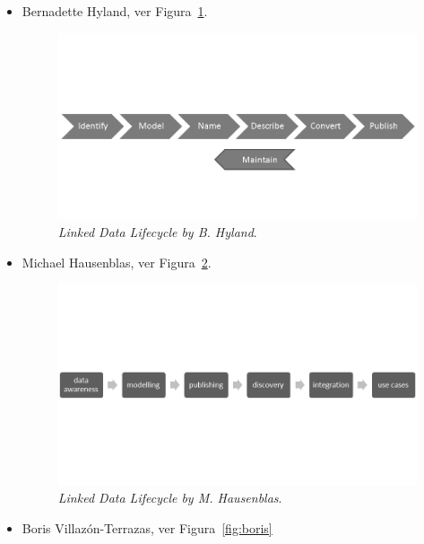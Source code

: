 \begin{itemize}
 \item Bernadette Hyland, ver Figura~\ref{fig:hyland}. 

\begin{figure}[!htb]
\centering
	\includegraphics[width=14cm]{images/phd/Hyland}
\caption{\textit{Linked Data Lifecycle by B. Hyland}.}
\label{fig:hyland}
\end{figure}


 \item Michael Hausenblas, ver Figura~\ref{fig:hausenblas}.

\begin{figure}[!htb]
\centering
	\includegraphics[width=14cm]{images/phd/Hausenblas}
\caption{\textit{Linked Data Lifecycle by M. Hausenblas}.}
\label{fig:hausenblas}
\end{figure}


 \item Boris Villazón-Terrazas, ver Figura~\ref{fig:boris}


\end{itemize}
